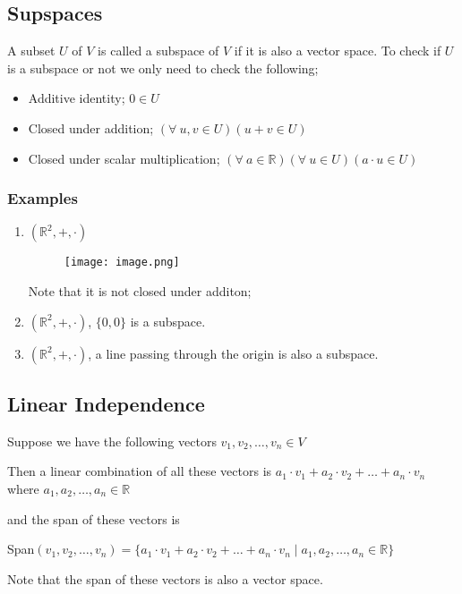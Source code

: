 \documentclass[12pt,a4paper]{article}
\begin{document}
\subsection{Supspaces}
A subset \(U\) of \(V\) is called a subspace of \(V\) if it is also a vector space. To check if \(U\) is a subspace or not we only need to check the following;
\begin{itemize}
    \item Additive identity; \(0 \in U\)
    \item Closed under addition; \((\forall \ u, v \in U )(u+v \in U)\)
    \item Closed under scalar multiplication; \((\forall \ a \in \mathbb{R})(\forall \ u  \in U)(a\cdot u \in U)\)     
\end{itemize} 
\subsubsection{Examples}
\begin{enumerate}
    \item \(\left( \mathbb{R}^2, +, \cdot \right) \) 
    \begin{figure}[H]
        \centering
        \texttt{[image: image.png]}
    \end{figure} 
    Note that it is not closed under additon;

    \item \(\left( \mathbb{R}^2, + , \cdot \right) \),  \(\{0,0\}\)  
    is a subspace.
    \item\(\left( \mathbb{R}^2, + , \cdot \right) \), a line passing through the origin is also a subspace.
     \end{enumerate} 
     \subsection{Linear Independence}
     Suppose we have the following vectors \(v_{1},v_{2},\ldots,v_{n} \in V\)
     
     Then a linear combination of all these vectors is
     \(a_{1}\cdot v_{1}+ a_{2} \cdot v_{2} +\ldots +a_{n}\cdot v_{n}\) where \(a_{1},a_{2},\ldots,a_{n}\in \mathbb{R}\)
     
     and the span of these vectors is 

     Span\((v_{1},v_{2},\ldots,v_{n})=\{a_{1}\cdot v_{1} + a_{2} \cdot v_{2}+ \ldots  + a_{n}\cdot v_{n} \mid a_{1}, a_{2}, \ldots , a_{n} \in \mathbb{R}\}\) 
     
     Note that the span of these vectors is also a vector space.
\end{document}
